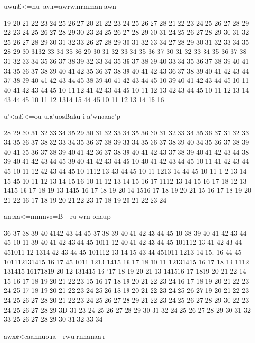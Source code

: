 uwu£<=nu~avn=awrwmrmman-awn

19 20 21 22 23 24 25 26 27
20 21 22 23 24 25 26 27 28
21 22 23 24 25 26 27 28 29
22 23 24 25 26 27 28 29 30
23 24 25 26 27 28 29 30 31
24 25 26 27 28 29 30 31 32
25 26 27 28 29 30 31 32 33
26 27 28 29 30 31 32 33 34
27 28 29 30 31 32 33 34 35
28 29 30 3132 33 34 35 36
29 30 31 32 33 34 35 36 37
30 31 32 33 34 35 36 37 38
31 32 33 34 35 36 37 38 39
32 33 34 35 36 37 38 39 40
33 34 35 36 37 38 39 40 41
34 35 36 37 38 39 40 41 42
35 36 37 38 39 40 41 42 43
36 37 38 39 40 41 42 43 44
37 38 39 40 41 42 43 44 45
38 39 40 41 42 43 44 45 10
39 40 41 42 43 44 45 10 11
40 41 42 43 44 45 10 11 12
41 42 43 44 45 10 11 12 13
42 43 44 45 10 11 12 13 14
43 44 45 10 11 12 1314 15
44 45 10 11 12 13 14 15 16

u'<a£<=ou-u.a'uosBaku-i-a'wnoaac'p

28 29 30 31 32 33 34 35
29 30 31 32 33 34 35 36
30 31 32 33 34 35 36 37
31 32 33 34 35 36 37 38
32 33 34 35 36 37 38 39
33 34 35 36 37 38 39 40
34 35 36 37 38 39 40 41
35 36 37 38 39 40 41 42
36 37 38 39 40 41 42 43
37 38 39 40 41 42 43 44
38 39 40 41 42 43 44 45
39 40 41 42 43 44 45 10
40 41 42 43 44 45 10 11
41 42 43 44 45 10 11 12
42 43 44 45 10 1112 13
43 44 45 10 11 1213 14
44 45 10 11 1-2 13 14 15
45 10 11 12 13 14 15 16
10 11 12 13 14 15 16 17
1112 13 14 15 16 17 18
12 13 1415 16 17 18 19
13 1415 16 17 18 19 20
14 1516 17 18 19 20 21
15 16 17 18 19 20 21 22
16 17 18 19 20 21 22 23
17 18 19 20 21 22 23 24

an:xa<=nnnnvo=B—ru-wrn-onaup

36 37 38 39 40 4142 43 44 45
37 38 39 40 41 42 43 44 45 10
38 39 40 41 42 43 44 45 10 11
39 40 41 42 43 44 45 1011 12
40 41 42 43 44 45 101112 13
41 42 43 44 451011 12 1314
42 43 44 45 101112 13 14 15
43 44 451011 1213 14 15. 16
44 45 101112131415 16 17
45 1011 1213 1415 16 17 18
10 11 12131415 16 17 18 19
1112 131415 16171819 20
12 131415 16 '17 18 19 20 21
13 141516 17 1819 20 21 22
14 15 16 17 18 19 20 21 22 23
15 16 17 18 19 20 21 22 23 24
16 17 18 19 20 21 22 23 24 25
17 18 19 20 21 22 23 24 25 26
18 19 20 21 22 23 24 25 26 27
19 20 21 22 23 24 25 26 27 28
20 21 22 23 24 25 26 27 28 29
21 22 23 24 25 26 27 28 29 30
22 23 24 25 26 27 28 29 3D 31
23 24 25 26 27 28 29 30 31 32
24 25 26 27 28 29 30 31 32 33
25 26 27 28 29 30 31 32 33 34

awx¢<caannuoua—rwu-rnnanaa‘r

 

 

 

